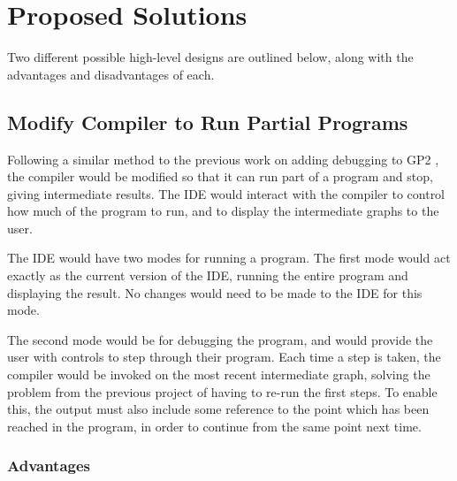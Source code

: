 \documentclass[authoryearcitations]{UoYCSproject}
\begin{document}

\section{Proposed Solutions}
\label{sec:ProposedSolutions}

Two different possible high-level designs are outlined below, along with the
advantages and disadvantages of each.


\subsection{Modify Compiler to Run Partial Programs}
\label{sec:ProposedDesign1}

Following a similar method to the previous work on adding debugging to GP2
\citep{taylor2016}, the compiler would be modified so that it can run part of a
program and stop, giving intermediate results. The IDE would interact with the
compiler to control how much of the program to run, and to display the
intermediate graphs to the user.

The IDE would have two modes for running a program. The first mode would act
exactly as the current version of the IDE, running the entire program and
displaying the result. No changes would need to be made to the IDE for this mode.

The second mode would be for debugging the program, and would provide the user
with controls to step through their program. Each time a step is taken, the
compiler would be invoked on the most recent intermediate graph, solving the
problem from the previous project of having to re-run the first steps. To
enable this, the output must also include some reference to the point which has
been reached in the program, in order to continue from the same point next time.


\subsubsection{Advantages}
\label{sec:ProposedDesign1Advantages}
\end{document}
